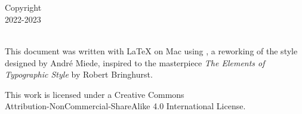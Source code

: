 
\thispagestyle{empty}

\hfill


\begin{center}
\myName \\
\smallskip
\textit{\myTitle}\\
\smallskip
Copyright \ccbyncsa\\
2022-2023
\end{center}

\medskip

\noindent\textsf{} \\
\noindent
This document was written with \LaTeX{} on Mac using \arsclassica, a reworking of the \classicthesis{} style designed by Andr\'e Miede, inspired to the masterpiece \emph{The Elements of Typographic Style} by Robert Bringhurst.

\bigskip

\noindent This work is licensed under a Creative Commons\\
Attribution-NonCommercial-ShareAlike 4.0 International License.

\bigskip

\noindent
\textsf{}

\noindent
{}\,
